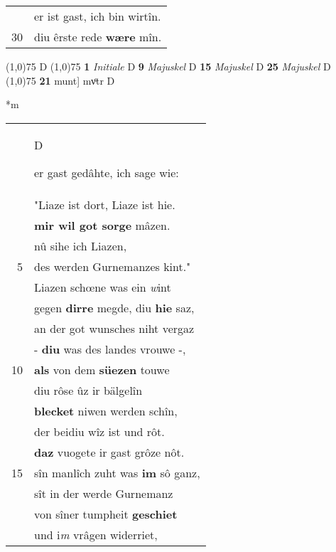 \documentclass[8pt,a4paper,notitlepage]{article}
\begin{document}
\begin{table}[ht]
\begin{minipage}[t]{0.5\linewidth}
\begin{tabular}{rl}
 & er ist gast, ich bin wirtîn.\\ 
30 & diu êrste rede \textbf{wære} mîn.\\ 
\end{tabular}
\scriptsize
\line(1,0){75} \newline
D \newline
\line(1,0){75} \newline
\textbf{1} \textit{Initiale} D  \textbf{9} \textit{Majuskel} D  \textbf{15} \textit{Majuskel} D  \textbf{25} \textit{Majuskel} D  \newline
\line(1,0){75} \newline
\textbf{21} munt] mvͦtr D \newline
\end{minipage}
\hspace{0.5cm}
\begin{minipage}[t]{0.5\linewidth}
\small
\begin{center}*m
\end{center}
\begin{tabular}{rl}
 & \begin{large}D\end{large}er gast gedâhte, ich sage wie:\\ 
 & "Liaze ist dort, Liaze ist hie.\\ 
 & \textbf{mir wil got sorge} mâzen.\\ 
 & nû sihe ich Liazen,\\ 
5 & des werden Gurnemanzes kint."\\ 
 & Liazen schœne was ein \textit{w}int\\ 
 & gegen \textbf{dirre} megde, diu \textbf{hie} saz,\\ 
 & an der got wunsches niht vergaz\\ 
 & - \textbf{diu} was des landes vrouwe -,\\ 
10 & \textbf{als} von dem \textbf{süezen} touwe\\ 
 & diu rôse ûz ir bälgelîn\\ 
 & \textbf{blecket} niwen werden schîn,\\ 
 & der beidiu wîz ist und rôt.\\ 
 & \textbf{daz} vuogete ir gast grôze nôt.\\ 
15 & sîn manlîch zuht was \textbf{im} sô ganz,\\ 
 & sît in der werde Gurnemanz\\ 
 & von sîner tumpheit \textbf{geschiet}\\ 
 & und i\textit{m} vrâgen widerriet,\\ 

\end{tabular}
\end{minipage}
\end{table}
\end{document}
